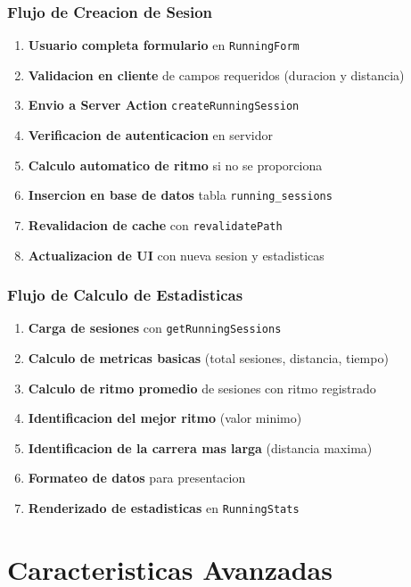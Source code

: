 \documentclass[12pt,a4paper]{article}
\begin{document}
\subsubsection{Flujo de Creacion de Sesion}

\begin{enumerate}
    \item \textbf{Usuario completa formulario} en \texttt{RunningForm}
    \item \textbf{Validacion en cliente} de campos requeridos (duracion y distancia)
    \item \textbf{Envio a Server Action} \texttt{createRunningSession}
    \item \textbf{Verificacion de autenticacion} en servidor
    \item \textbf{Calculo automatico de ritmo} si no se proporciona
    \item \textbf{Insercion en base de datos} tabla \texttt{running\_sessions}
    \item \textbf{Revalidacion de cache} con \texttt{revalidatePath}
    \item \textbf{Actualizacion de UI} con nueva sesion y estadisticas
\end{enumerate}

\subsubsection{Flujo de Calculo de Estadisticas}

\begin{enumerate}
    \item \textbf{Carga de sesiones} con \texttt{getRunningSessions}
    \item \textbf{Calculo de metricas basicas} (total sesiones, distancia, tiempo)
    \item \textbf{Calculo de ritmo promedio} de sesiones con ritmo registrado
    \item \textbf{Identificacion del mejor ritmo} (valor minimo)
    \item \textbf{Identificacion de la carrera mas larga} (distancia maxima)
    \item \textbf{Formateo de datos} para presentacion
    \item \textbf{Renderizado de estadisticas} en \texttt{RunningStats}
\end{enumerate}

\section{Caracteristicas Avanzadas}
\end{document}

